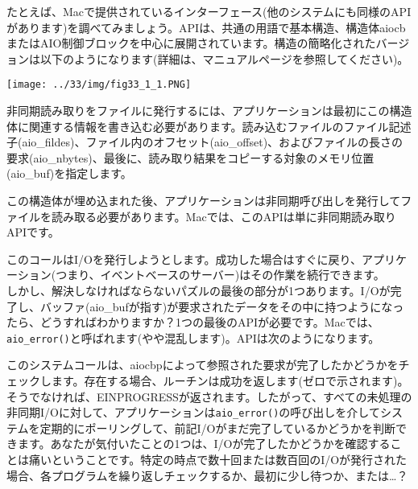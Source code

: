 たとえば、Macで提供されているインターフェース(他のシステムにも同様のAPIがあります)を調べてみましょう。APIは、共通の用語で基本構造、構造体aiocbまたはAIO制御ブロックを中心に展開されています。構造の簡略化されたバージョンは以下のようになります(詳細は、マニュアルページを参照してください)。

\texttt{[image: ../33/img/fig33\_1\_1.PNG]}

非同期読み取りをファイルに発行するには、アプリケーションは最初にこの構造体に関連する情報を書き込む必要があります。読み込むファイルのファイル記述子(aio\_fildes)、ファイル内のオフセット(aio\_offset)、およびファイルの長さの要求(aio\_nbytes)、最後に、読み取り結果をコピーする対象のメモリ位置(aio\_buf)を指定します。

この構造体が埋め込まれた後、アプリケーションは非同期呼び出しを発行してファイルを読み取る必要があります。Macでは、このAPIは単に非同期読み取りAPIです。

\begin{Shaded}
\begin{Highlighting}[]
\end{Highlighting}
\end{Shaded}

このコールはI/Oを発行しようとします。成功した場合はすぐに戻り、アプリケーション(つまり、イベントベースのサーバー)はその作業を続行できます。\\
しかし、解決しなければならないパズルの最後の部分が1つあります。I/Oが完了し、バッファ(aio\_bufが指す)が要求されたデータをその中に持つようになったら、どうすればわかりますか？1つの最後のAPIが必要です。Macでは、\texttt{aio\_error()}と呼ばれます(やや混乱します)。APIは次のようになります。

\begin{Shaded}
\begin{Highlighting}[]
 
\end{Highlighting}
\end{Shaded}

このシステムコールは、aiocbpによって参照された要求が完了したかどうかをチェックします。存在する場合、ルーチンは成功を返します(ゼロで示されます)。そうでなければ、EINPROGRESSが返されます。したがって、すべての未処理の非同期I/Oに対して、アプリケーションは\texttt{aio\_error()}の呼び出しを介してシステムを定期的にポーリングして、前記I/Oがまだ完了しているかどうかを判断できます。あなたが気付いたことの1つは、I/Oが完了したかどうかを確認することは痛いということです。特定の時点で数十回または数百回のI/Oが発行された場合、各プログラムを繰り返しチェックするか、最初に少し待つか、または\ldots？

